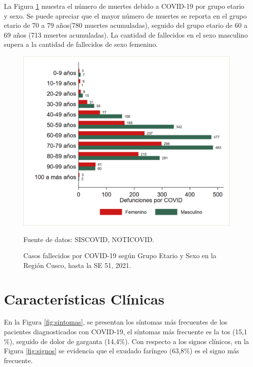 \documentclass[12pt,a4paper,openany]{book}
\begin{document}
La Figura  \ref{fig:fallecidos_edad_sexo}  muestra el número de muertes debido a COVID-19 por grupo etario y sexo. Se puede apreciar que el mayor número de muertes se reporta en el grupo etario de 70 a 79 años(780 muertes acumuladas), seguido del grupo etario de 60 a 69 años (713 muertes acumuladas). La cantidad de fallecidos en el sexo masculino supera a la cantidad de fallecidos de sexo femenino.
	\begin{figure}[h]
		\caption{Casos fallecidos por COVID-19 según Grupo Etario y Sexo en la Región Cusco, hasta la SE 51, 2021.}\label{fig:fallecidos_edad_sexo}
		\begin{center}
			\includegraphics[width=0.75\linewidth]{../figuras/defunciones_etapavida}
		\end{center}
		{\footnotesize {Fuente de datos: SISCOVID, NOTICOVID.}}
	\end{figure}


\cleardoublepage


\clearpage

\section*{Características Clínicas}


\noindent En la Figura \ref{fig:sintomas}, se presentan los síntomas más frecuentes de los pacientes diagnosticados con COVID-19, el síntomas más frecuente es la tos (15,1$\%$), seguido de dolor de garganta (14,4$\%$). Con respecto a los signos clínicos, en la Figura \ref{fig:signos} se evidencia que el exudado faríngeo (63,8$\%$) es el signo más frecuente. 
\end{document}
